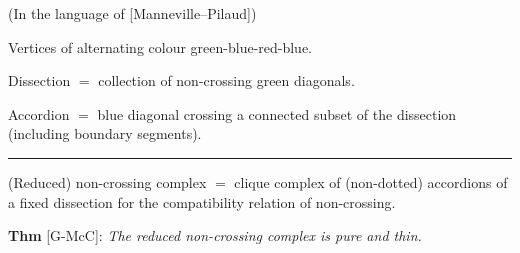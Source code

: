 \documentclass[portrait,final,a0paper,fontscale=0.25]{baposter}
\theoremstyle{definition}
\begin{document}
\begin{poster}
{(In the language of [Manneville--Pilaud])

\smallskip

Vertices of alternating colour green-blue-red-blue.

\smallskip

{\color{blue} Dissection} $=$ collection of non-crossing green diagonals.

\smallskip

{\color{blue} Accordion} $=$ blue diagonal crossing a connected subset of the dissection (including boundary segments).


\vspace{-.1cm}
\hspace{-.25cm}
{\color{blue} \rule{10.02cm}{1pt}}
\vspace{-.35cm}

{\color{blue} (Reduced) non-crossing complex} $=$ clique complex of (non-dotted) accordions of a fixed dissection for the compatibility relation of non-crossing.

\smallskip

{\color{blue} \bf Thm} [G-McC]: {\it The reduced non-crossing complex is pure and thin.}


}

\end{poster}
\end{document}
